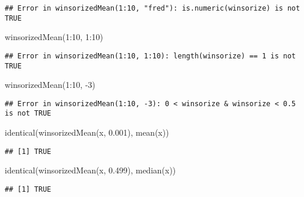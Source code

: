\documentclass[
]{article}
\newenvironment{Shaded}{\begin{snugshade}}{\end{snugshade}}
\newcommand{\DecValTok}[1]{\textcolor[rgb]{0.00,0.00,0.81}{#1}}
\newcommand{\FloatTok}[1]{\textcolor[rgb]{0.00,0.00,0.81}{#1}}
\newcommand{\FunctionTok}[1]{\textcolor[rgb]{0.00,0.00,0.00}{#1}}
\newcommand{\NormalTok}[1]{#1}
\newcommand{\SpecialCharTok}[1]{\textcolor[rgb]{0.00,0.00,0.00}{#1}}
\begin{document}
\begin{verbatim}
## Error in winsorizedMean(1:10, "fred"): is.numeric(winsorize) is not TRUE
\end{verbatim}

\begin{Shaded}
\begin{Highlighting}[]
\FunctionTok{winsorizedMean}\NormalTok{(}\DecValTok{1}\SpecialCharTok{:}\DecValTok{10}\NormalTok{, }\DecValTok{1}\SpecialCharTok{:}\DecValTok{10}\NormalTok{)}
\end{Highlighting}
\end{Shaded}

\begin{verbatim}
## Error in winsorizedMean(1:10, 1:10): length(winsorize) == 1 is not TRUE
\end{verbatim}

\begin{Shaded}
\begin{Highlighting}[]
\FunctionTok{winsorizedMean}\NormalTok{(}\DecValTok{1}\SpecialCharTok{:}\DecValTok{10}\NormalTok{, }\SpecialCharTok{{-}}\DecValTok{3}\NormalTok{)}
\end{Highlighting}
\end{Shaded}

\begin{verbatim}
## Error in winsorizedMean(1:10, -3): 0 < winsorize & winsorize < 0.5 is not TRUE
\end{verbatim}

\begin{Shaded}
\begin{Highlighting}[]
\FunctionTok{identical}\NormalTok{(}\FunctionTok{winsorizedMean}\NormalTok{(x, }\FloatTok{0.001}\NormalTok{), }\FunctionTok{mean}\NormalTok{(x))}
\end{Highlighting}
\end{Shaded}

\begin{verbatim}
## [1] TRUE
\end{verbatim}

\begin{Shaded}
\begin{Highlighting}[]
\FunctionTok{identical}\NormalTok{(}\FunctionTok{winsorizedMean}\NormalTok{(x, }\FloatTok{0.499}\NormalTok{), }\FunctionTok{median}\NormalTok{(x))}
\end{Highlighting}
\end{Shaded}

\begin{verbatim}
## [1] TRUE
\end{verbatim}
\end{document}
